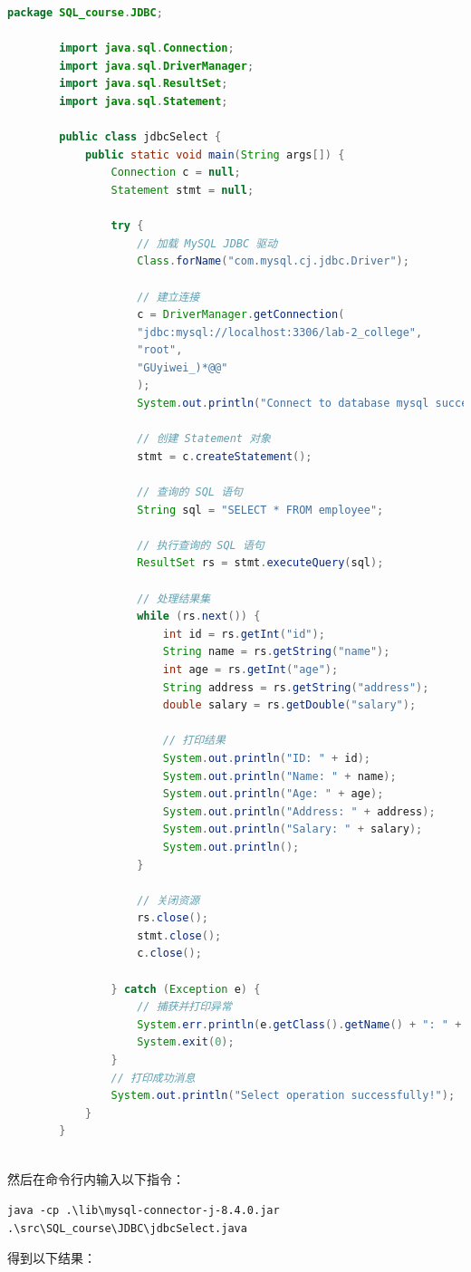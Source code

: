 \documentclass{article}
\begin{document}
	\begin{lstlisting}[language=java, title=jdbcSelect, tabsize=4]
		package SQL_course.JDBC;
		
		import java.sql.Connection;
		import java.sql.DriverManager;
		import java.sql.ResultSet;
		import java.sql.Statement;
		
		public class jdbcSelect {
			public static void main(String args[]) {
				Connection c = null;
				Statement stmt = null;
				
				try {
					// 加载 MySQL JDBC 驱动
					Class.forName("com.mysql.cj.jdbc.Driver");
					
					// 建立连接
					c = DriverManager.getConnection(
					"jdbc:mysql://localhost:3306/lab-2_college",
					"root",
					"GUyiwei_)*@@"
					);
					System.out.println("Connect to database mysql successfully!");
					
					// 创建 Statement 对象
					stmt = c.createStatement();
					
					// 查询的 SQL 语句
					String sql = "SELECT * FROM employee";
					
					// 执行查询的 SQL 语句
					ResultSet rs = stmt.executeQuery(sql);
					
					// 处理结果集
					while (rs.next()) {
						int id = rs.getInt("id");
						String name = rs.getString("name");
						int age = rs.getInt("age");
						String address = rs.getString("address");
						double salary = rs.getDouble("salary");
						
						// 打印结果
						System.out.println("ID: " + id);
						System.out.println("Name: " + name);
						System.out.println("Age: " + age);
						System.out.println("Address: " + address);
						System.out.println("Salary: " + salary);
						System.out.println();
					}
					
					// 关闭资源
					rs.close();
					stmt.close();
					c.close();
					
				} catch (Exception e) {
					// 捕获并打印异常
					System.err.println(e.getClass().getName() + ": " + e.getMessage());
					System.exit(0);
				}
				// 打印成功消息
				System.out.println("Select operation successfully!");
			}
		}
		
	\end{lstlisting}
	
	然后在命令行内输入以下指令：
	
	\verb|java -cp .\lib\mysql-connector-j-8.4.0.jar .\src\SQL_course\JDBC\jdbcSelect.java|
	
	得到以下结果：
	
\end{document}
